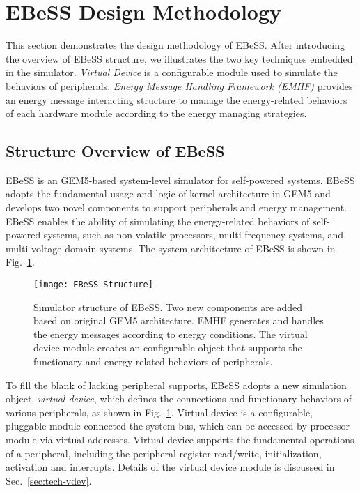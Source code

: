 \section{EBeSS Design Methodology}	\label{sec:tech}
%
This section demonstrates the design methodology of EBeSS.
After introducing the overview of EBeSS structure, we illustrates the two key techniques embedded in the simulator.
\emph{Virtual Device} is a configurable module used to simulate the behaviors of peripherals.
\emph{Energy Message Handling Framework (EMHF)} provides an energy message interacting structure to manage the energy-related behaviors of each hardware module according to the energy managing strategies.

\subsection{Structure Overview of EBeSS}		\label{sec:tech-structure}
%
EBeSS is an GEM5-based system-level simulator for self-powered systems. 
EBeSS adopts the fundamental usage and logic of kernel architecture in GEM5 and develops two novel components to support peripherals and energy management.
EBeSS enables the ability of simulating the energy-related behaviors of self-powered systems, such as non-volatile processors, multi-frequency systems, and multi-voltage-domain systems. 
The system architecture of EBeSS is shown in Fig.~\ref{fig:techStructure}.

\begin{figure}[!htpb]
	\centering
	\vspace{-10pt}
	\texttt{[image: EBeSS\_Structure]}
	\vspace{-20pt}
	\caption{Simulator structure of EBeSS. Two new components are added based on original GEM5 architecture. EMHF generates and handles the energy messages according to energy conditions. The virtual device module creates an configurable object that supports the functionary and energy-related behaviors of peripherals.}		\label{fig:techStructure}
\end{figure}

%
To fill the blank of lacking peripheral supports, EBeSS adopts a new simulation object, \emph{virtual device}, which defines the connections and functionary behaviors of various peripherals, as shown in Fig.~\ref{fig:techStructure}.
Virtual device is a configurable, pluggable module connected the system bus, which can be accessed by processor module via virtual addresses. 
Virtual device supports the fundamental operations of a peripheral, including the peripheral register read/write, initialization, activation and interrupts.
Details of the virtual device module is discussed in Sec.~\ref{sec:tech-vdev}.

